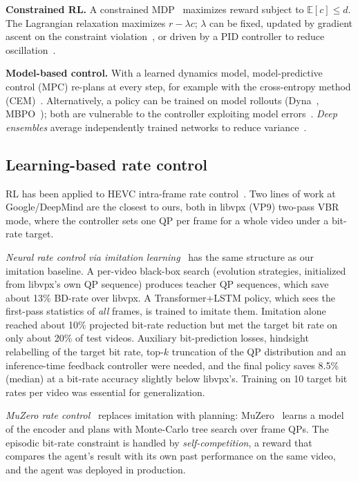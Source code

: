 \documentclass[conference]{IEEEtran}
\begin{document}
\textbf{Constrained RL.} A constrained MDP~\cite{altman1999cmdp} maximizes reward subject to $\mathbb{E}[c] \le d$. The Lagrangian relaxation maximizes $r - \lambda c$; $\lambda$ can be fixed, updated by gradient ascent on the constraint violation~\cite{tessler2019rcpo}, or driven by a PID controller to reduce oscillation~\cite{stooke2020pid}.

\textbf{Model-based control.} With a learned dynamics model, model-predictive control (MPC) re-plans at every step, for example with the cross-entropy method (CEM)~\cite{rubinstein1997cem,chua2018pets}. Alternatively, a policy can be trained on model rollouts (Dyna~\cite{sutton1991dyna}, MBPO~\cite{janner2019mbpo}); both are vulnerable to the controller exploiting model errors~\cite{janner2019mbpo}. \emph{Deep ensembles} average independently trained networks to reduce variance~\cite{lakshminarayanan2017ensembles}.

\subsection{Learning-based rate control}
RL has been applied to HEVC intra-frame rate control~\cite{hu2018rlintra}. Two lines of work at Google/DeepMind are the closest to ours, both in libvpx (VP9) two-pass VBR mode, where the controller sets one QP per frame for a whole video under a bit-rate target.

\emph{Neural rate control via imitation learning}~\cite{mao2020neural} has the same structure as our imitation baseline. A per-video black-box search (evolution strategies, initialized from libvpx's own QP sequence) produces teacher QP sequences, which save about 13\% BD-rate over libvpx. A Transformer+LSTM policy, which sees the first-pass statistics of \emph{all} frames, is trained to imitate them. Imitation alone reached about 10\% projected bit-rate reduction but met the target bit rate on only about 20\% of test videos. Auxiliary bit-prediction losses, hindsight relabelling of the target bit rate, top-$k$ truncation of the QP distribution and an inference-time feedback controller were needed, and the final policy saves 8.5\% (median) at a bit-rate accuracy slightly below libvpx's. Training on 10 target bit rates per video was essential for generalization.

\emph{MuZero rate control}~\cite{mandhane2022muzero} replaces imitation with planning: MuZero~\cite{schrittwieser2020muzero} learns a model of the encoder and plans with Monte-Carlo tree search over frame QPs. The episodic bit-rate constraint is handled by \emph{self-competition}, a reward that compares the agent's result with its own past performance on the same video, and the agent was deployed in production.
\end{document}
